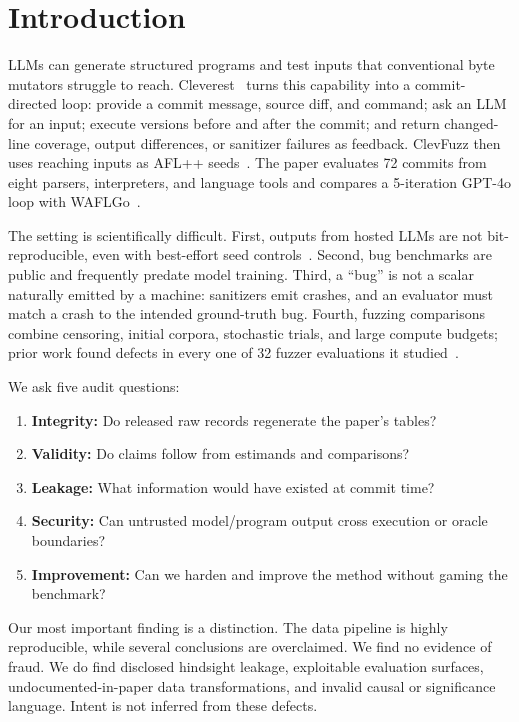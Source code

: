 \documentclass{article}
\begin{document}
\section{Introduction}

LLMs can generate structured programs and test inputs that conventional byte
mutators struggle to reach.  Cleverest~\cite{liu2026cleverest} turns this
capability into a commit-directed loop: provide a commit message, source diff,
and command; ask an LLM for an input; execute versions before and after the
commit; and return changed-line coverage, output differences, or sanitizer
failures as feedback.  ClevFuzz then uses reaching inputs as AFL++
seeds~\cite{aflpp}.  The paper evaluates 72 commits from eight parsers,
interpreters, and language tools and compares a 5-iteration GPT-4o loop with
WAFLGo~\cite{xiang2024waflgo}.

The setting is scientifically difficult.  First, outputs from hosted LLMs are
not bit-reproducible, even with best-effort seed controls~\cite{openai_seed}.
Second, bug benchmarks are public and frequently predate model training.
Third, a ``bug'' is not a scalar naturally emitted by a machine: sanitizers
emit crashes, and an evaluator must match a crash to the intended ground-truth
bug.  Fourth, fuzzing comparisons combine censoring, initial corpora, stochastic
trials, and large compute budgets; prior work found defects in every one of 32
fuzzer evaluations it studied~\cite{klees2018evaluating}.

We ask five audit questions:
\begin{enumerate}[nosep]
  \item \textbf{Integrity:} Do released raw records regenerate the paper's tables?
  \item \textbf{Validity:} Do claims follow from estimands and comparisons?
  \item \textbf{Leakage:} What information would have existed at commit time?
  \item \textbf{Security:} Can untrusted model/program output cross execution or oracle boundaries?
  \item \textbf{Improvement:} Can we harden and improve the method without gaming the benchmark?
\end{enumerate}

Our most important finding is a distinction.  The data pipeline is highly
reproducible, while several conclusions are overclaimed.  We find no evidence
of fraud.  We do find disclosed hindsight leakage, exploitable evaluation
surfaces, undocumented-in-paper data transformations, and invalid causal or
significance language.  Intent is not inferred from these defects.
\end{document}
